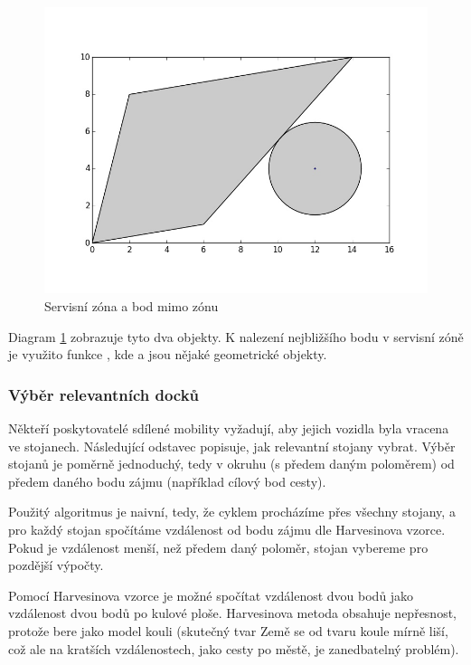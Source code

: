 \documentclass[thesis=M,czech]{FITthesis}[2019/12/23]
\theoremstyle{plain}
\theoremstyle{definition}
\begin{document}
\begin{figure}[H]\centering
	\includegraphics[width=1\textwidth]{graphs/service-zone-selection.jpg}

	\caption[Servisní zóna a bod mimo zónu]{Servisní zóna a bod mimo zónu}\label{fig:service-zone}

\end{figure}

Diagram \ref{fig:service-zone} zobrazuje tyto dva objekty. K nalezení nejbližšího bodu v servisní zóně je využito funkce , kde  a  jsou nějaké geometrické objekty.

\subsubsection{Výběr relevantních docků}\label{vyber-docku}

Někteří poskytovatelé sdílené mobility vyžadují, aby jejich vozidla byla vracena ve stojanech. Následující odstavec popisuje, jak relevantní stojany vybrat. Výběr stojanů je poměrně jednoduchý, tedy v okruhu (s předem daným poloměrem) od předem daného bodu zájmu (například cílový bod cesty).

Použitý algoritmus je naivní, tedy, že cyklem procházíme přes všechny stojany, a pro každý stojan spočítáme vzdálenost od bodu zájmu dle Harvesinova vzorce. Pokud je vzdálenost menší, než předem daný poloměr, stojan vybereme pro pozdější výpočty.

Pomocí Harvesinova vzorce\cite{harvesine} je možné spočítat vzdálenost dvou bodů jako vzdálenost dvou bodů po kulové ploše. Harvesinova metoda obsahuje nepřesnost, protože bere jako model kouli (skutečný tvar Země se od tvaru koule mírně liší, což ale na kratších vzdálenostech, jako cesty po městě, je zanedbatelný problém). 
\end{document}
